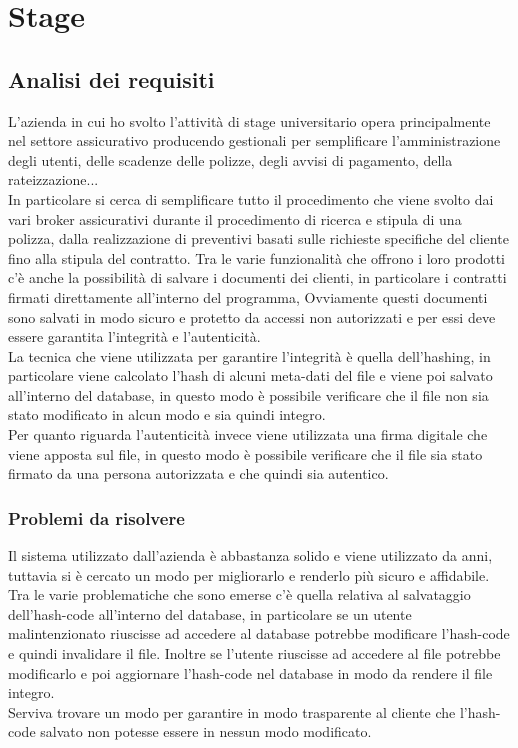 \section{Stage}

\subsection{Analisi dei requisiti}
L'azienda in cui ho svolto l'attività di stage universitario opera
principalmente nel settore assicurativo producendo gestionali per
semplificare l'amministrazione degli utenti, delle scadenze delle polizze,
degli avvisi di pagamento, della rateizzazione... \\
In particolare si cerca di semplificare tutto il procedimento che viene svolto
dai vari broker assicurativi durante il procedimento di ricerca e stipula di
una polizza, dalla realizzazione di preventivi basati sulle richieste
specifiche del cliente fino alla stipula del contratto.
Tra le varie funzionalità che offrono i loro prodotti c'è anche la possibilità
di salvare i documenti dei clienti, in particolare i contratti firmati 
direttamente all'interno del programma, Ovviamente questi documenti sono
salvati in modo sicuro e protetto da accessi non autorizzati e per essi deve 
essere garantita l'integrità e l'autenticità. \\
La tecnica che viene utilizzata per garantire l'integrità è quella
dell'hashing, in particolare viene calcolato l'hash di alcuni meta-dati del
file e viene poi salvato all'interno del database, in questo modo è possibile
verificare che il file non sia stato modificato in alcun modo e sia quindi
integro. \\
Per quanto riguarda l'autenticità invece viene utilizzata una firma digitale
che viene apposta sul file, in questo modo è possibile verificare che il file
sia stato firmato da una persona autorizzata e che quindi sia autentico. 

\subsubsection{Problemi da risolvere}
Il sistema utilizzato dall'azienda è abbastanza solido e viene utilizzato da
anni, tuttavia si è cercato un modo per migliorarlo e renderlo più sicuro e
affidabile. \\
Tra le varie problematiche che sono emerse c'è quella relativa al salvataggio
dell'hash-code all'interno del database, in particolare se un utente
malintenzionato riuscisse ad accedere al database potrebbe modificare
l'hash-code e quindi invalidare il file. Inoltre se l'utente riuscisse ad
accedere al file potrebbe modificarlo e poi aggiornare l'hash-code nel database
in modo da rendere il file integro. \\
Serviva trovare un modo per garantire in modo trasparente al cliente che
l'hash-code salvato non potesse essere in nessun modo modificato.

